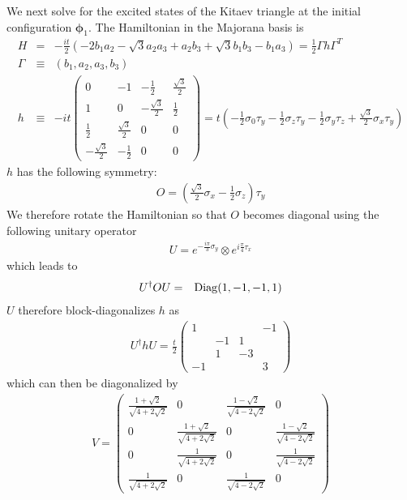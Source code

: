 \documentclass[aps,prb,showpacs,amsmath,amssymb,superscriptaddress]{revtex4-2}
\begin{document}
We next solve for the excited states of the Kitaev triangle at the initial configuration $\boldsymbol{\phi}_1$. The Hamiltonian in the Majorana basis is
\begin{eqnarray}
	H &=& -\frac{it}{2}\left( -2b_1 a_2 - \sqrt{3} a_2 a_3 + a_2 b_3 + \sqrt{3} b_1 b_3 - b_1 a_3   \right) = \frac{1}{2}\Gamma h\Gamma^T\\\nonumber
 \Gamma &\equiv& (b_1, a_2, a_3, b_3)\\\nonumber
h&\equiv&-it\begin{pmatrix}
	0 & -1 & -\frac{1}{2} & \frac{\sqrt{3}}{2} \\
	1 & 0 & -\frac{\sqrt{3}}{2} & \frac{1}{2}\\
	\frac{1}{2} & \frac{\sqrt{3}}{2} & 0 & 0 \\
	-\frac{\sqrt{3}}{2} & -\frac{1}{2} & 0 & 0
\end{pmatrix} = t\left( -\frac{1}{2}\sigma_0 \tau_y - \frac{1}{2}\sigma_z\tau_y -\frac{1}{2}\sigma_y \tau_z + \frac{\sqrt{3}}{2} \sigma_x \tau_y \right)
\end{eqnarray}
$h$ has the following symmetry:
\begin{eqnarray}
	O = \left(\frac{\sqrt{3}}{2}\sigma_x - \frac{1}{2}\sigma_z\right) \tau_y
\end{eqnarray}
We therefore rotate the Hamiltonian so that $O$ becomes diagonal using the following unitary operator
\begin{eqnarray}
	U = e^{-\frac{i\pi}{3}\sigma_y}\otimes e^{i\frac{\pi}{4}\tau_x}
\end{eqnarray}
which leads to 
\begin{eqnarray}
	U^\dag O U &=& {\rm Diag}(1,-1,-1,1)
\end{eqnarray}
$U$ therefore block-diagonalizes $h$ as
\begin{eqnarray}
	U^\dag h U = 	\frac{t}{2}\begin{pmatrix}
		1 &  &  & -1 \\
		& -1 & 1 & \\
		& 1 & -3 & \\
		-1 & & & 3 
	\end{pmatrix}
\end{eqnarray}
which can then be diagonalized by
\begin{eqnarray}
	V = \begin{pmatrix}
		\frac{1+ \sqrt{2}}{\sqrt{4+2\sqrt{2}}} & 0 & \frac{1 - \sqrt{2}}{\sqrt{4-2\sqrt{2}}} & 0 \\
		0 & \frac{1 + \sqrt{2}}{\sqrt{4 + 2\sqrt{2}}} & 0 & \frac{1-\sqrt{2}}{\sqrt{4 - 2\sqrt{2}}} \\
		0 & \frac{1}{\sqrt{4+ 2\sqrt{2}}} & 0 & \frac{1}{\sqrt{4 - 2\sqrt{2}}} \\
		\frac{1}{\sqrt{4+2\sqrt{2}}} & 0 & \frac{1}{\sqrt{4-2\sqrt{2}}} & 0
	\end{pmatrix}
\end{eqnarray}
\end{document}
